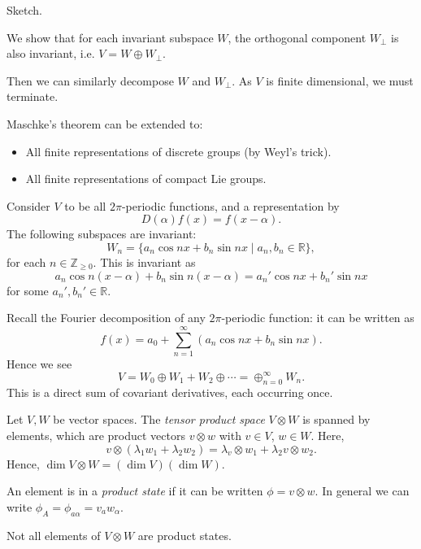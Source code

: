 \documentclass[12pt]{article}
\begin{document}
\begin{proofbox}
	Sketch.

	We show that for each invariant subspace $W$, the orthogonal component $W_{\perp}$ is also invariant, i.e. $V =  W \oplus W_{\perp}$.

	Then we can similarly decompose $W$ and $W_{\perp}$. As $V$ is finite dimensional, we must terminate.
\end{proofbox}

Maschke's theorem can be extended to:
\begin{itemize}
	\item All finite representations of discrete groups (by Weyl's trick).
	\item All finite representations of compact Lie groups.
\end{itemize}

\begin{exbox}
	Consider $V$ to be all $2\pi$-periodic functions, and a representation by
	\[
	D(\alpha) f(x) = f(x - \alpha).
	\]
	The following subspaces are invariant:
	\[
		W_n = \{a_n \cos n x + b_n \sin nx \mid a_n, b_n \in \mathbb{R} \},
	\]
	for each $n \in \mathbb{Z}_{\geq 0}$. This is invariant as
	\[
	a_n \cos n(x - \alpha) + b_n \sin n(x - \alpha) = a_n' \cos nx + b_n' \sin nx
	\]
	for some $a_n', b_n' \in \mathbb{R}$.

	Recall the Fourier decomposition of any $2\pi$-periodic function: it can be written as
	\[
	f(x) = a_0 + \sum_{n = 1}^\infty (a_n \cos nx + b_n \sin nx).
	\]
	Hence we see
	\[
	V = W_0 \oplus W_1 + W_2 \oplus \cdots = \oplus_{n = 0}^{\infty} W_n.
	\]
	This is a direct sum of covariant derivatives, each occurring once.
\end{exbox}

\begin{definition}
	Let $V, W$ be vector spaces. The \emph{tensor product space} $V \otimes W$ is spanned by elements, which are product vectors $v \otimes w$ with $v \in V$, $w \in W$. Here,
	\[
	v \otimes (\lambda_1 w_1 + \lambda_2 w_2) = \lambda_ v \otimes w_1  + \lambda_2 v \otimes w_2.
	\]
	Hence, $\dim V \otimes W = (\dim V)(\dim W)$.

	An element is in a \emph{product state} if it can be written $\phi = v\otimes w$. In general we can write $\phi_A = \phi_{a\alpha} = v_a w_\alpha$.

	Not all elements of $V \otimes W$ are product states.
\end{definition}
\end{document}
